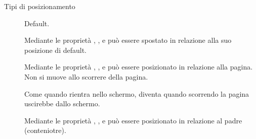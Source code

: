 \begin{frame}{Tipi di posizionamento}\transfade\centering
  \begin{description}
    \item[] Default.
    \item[] Mediante le proprietà , ,  e  può essere spostato in relazione alla suo posizione di default.
    \item[] Mediante le proprietà , ,  e  può essere posizionato in relazione alla pagina. Non si muove allo scorrere della pagina.
    \item[] Come  quando rientra nello schermo, diventa  quando scorrendo la pagina uscirebbe dallo schermo.
    \item[] Mediante le proprietà , ,  e  può essere posizionato in relazione al padre (conteniotre).
  \end{description}
\end{frame}




